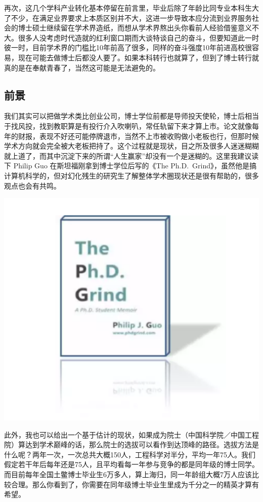 \documentclass[
]{book}
\begin{document}
再次，这几个学科产业转化基本停留在前言里，毕业后除了年龄比同专业本科生大了不少，在满足业界要求上本质区别并不大，这进一步导致本应分流到业界服务社会的博士硕士继续留在学术界造纸，而想从学术界熬出头你看前人经验借鉴意义不大。很多人没考虑时代造就的红利窗口期而大谈特谈自己的奋斗，但要知道此一时彼一时，目前学术界的门槛比10年前高了很多，同样的奋斗强度10年前进高校很容易，现在可能去做博士后都没人要了。如果本科转行也就算了，但到了博士转行就真的是在奉献青春了，当然这可能是无法避免的。

\hypertarget{ux524dux666f}{%
\subsection{前景}\label{ux524dux666f}}

我们其实可以把做学术类比创业公司，博士学位前都是导师投天使轮，博士后相当于找风投，找到教职算是有投行介入吹喇叭，常任轨留下来才算上市。论文就像每年的财报，表现不好还可能停牌退市，当然不上市被收购做小老板也行，但那时候学术方向就会完全被大老板把持了。这个过程就是现状，目之所及很多人迷迷糊糊就上道了，而其中沉淀下来的所谓``人生赢家''却没有一个是迷糊的。这里我建议读下 Philip Guo 在斯坦福刚拿到博士学位后写的《The Ph.D.~Grind》，虽然他是搞计算机科学的，但对幻化残生的研究生了解整体学术圈现状还是很有帮助的，很多观点也会有共鸣。

\includegraphics[width=6.67in]{images/hhcs2}

此外，我也可以给出一个基于估计的现状，如果成为院士（中国科学院／中国工程院）算达到学术巅峰的话，那么院士的选拔可以看作到达顶峰的路径。选拔方法是什么呢？两年一次，一次总共大概150人，工程科学对半分，平均一年75人。我们假定若干年后每年还是75人，且平均看每一年参与竞争的都是同年级的博士同学。而目前每年全国土鳖博士毕业生6万多人，算上海归，同一年龄组大概7万人应该比较合理。那么你看到了，你需要在同年级博士毕业生里成为千分之一的精英才算有希望。
\end{document}
